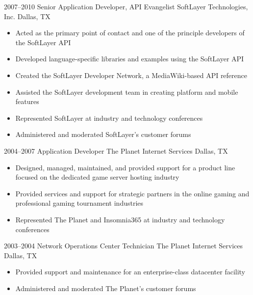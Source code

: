 \documentclass[11pt,a4paper,sans]{moderncv}
\begin{document}
    \cventry
      {2007--2010}
      {Senior Application Developer, API Evangelist}
      {SoftLayer Technologies, Inc.}
      {Dallas, TX}
      {}
      {
        \begin{itemize}
          \item Acted as the primary point of contact and one of the principle developers of the SoftLayer API
          \item Developed language-specific libraries and examples using the SoftLayer API
          \item Created the SoftLayer Developer Network, a MediaWiki-based API reference
          \item Assisted the SoftLayer development team in creating platform and mobile features
          \item Represented SoftLayer at industry and technology conferences
          \item Administered and moderated SoftLayer's customer forums
        \end{itemize}
      }

    \cventry
      {2004--2007}
      {Application Developer}
      {The Planet Internet Services}
      {Dallas, TX}
      {}
      {
        \begin{itemize}
          \item Designed, managed, maintained, and provided support for a product line focused on the dedicated game server hosting industry
          \item Provided services and support for strategic partners in the online gaming and professional gaming tournament industries
          \item Represented The Planet and Insomnia365 at industry and technology conferences
        \end{itemize}
      }

    \cventry
      {2003--2004}
      {Network Operations Center Technician}
      {The Planet Internet Services}
      {Dallas, TX}
      {}
      {
        \begin{itemize}
          \item Provided support and maintenance for an enterprise-class datacenter facility
          \item Administered and moderated The Planet's customer forums
        \end{itemize}
      }
\end{document}
